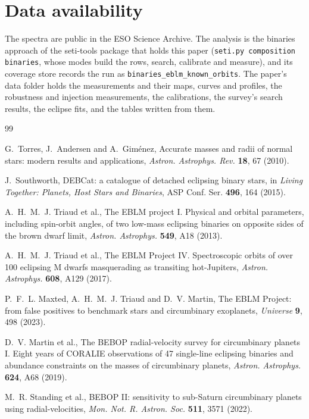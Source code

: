 \documentclass[3p,11pt]{elsarticle}
\begin{document}
\section*{Data availability}

The spectra are public in the ESO Science Archive. The analysis is the binaries approach of the
seti-tools package that holds this paper (\texttt{seti.py composition binaries}, whose modes build
the rows, search, calibrate and measure), and its coverage store records the run as
\texttt{binaries\_eblm\_known\_orbits}. The paper's data folder holds the measurements and their
maps, curves and profiles, the robustness and injection measurements, the calibrations, the
survey's search results, the eclipse fits, and the tables written from them.

\begin{thebibliography}{99}\small\raggedright
\setlength{\itemsep}{1pt}

G.~Torres, J.~Andersen and A.~Gim\'enez, Accurate masses and radii of normal stars: modern
results and applications, \emph{Astron. Astrophys. Rev.} \textbf{18}, 67 (2010).

J.~Southworth, DEBCat: a catalogue of detached eclipsing binary stars, in \emph{Living Together:
Planets, Host Stars and Binaries}, ASP Conf. Ser. \textbf{496}, 164 (2015).

A.~H.~M.~J. Triaud et al., The EBLM project I. Physical and orbital parameters, including
spin-orbit angles, of two low-mass eclipsing binaries on opposite sides of the brown dwarf limit,
\emph{Astron. Astrophys.} \textbf{549}, A18 (2013).

A.~H.~M.~J. Triaud et al., The EBLM Project IV. Spectroscopic orbits of over 100 eclipsing M
dwarfs masquerading as transiting hot-Jupiters, \emph{Astron. Astrophys.} \textbf{608}, A129
(2017).

P.~F.~L. Maxted, A.~H.~M.~J. Triaud and D.~V. Martin, The EBLM Project: from false positives to
benchmark stars and circumbinary exoplanets, \emph{Universe} \textbf{9}, 498 (2023).

D.~V. Martin et al., The BEBOP radial-velocity survey for circumbinary planets I. Eight years of
CORALIE observations of 47 single-line eclipsing binaries and abundance constraints on the masses
of circumbinary planets, \emph{Astron. Astrophys.} \textbf{624}, A68 (2019).

M.~R. Standing et al., BEBOP II: sensitivity to sub-Saturn circumbinary planets using
radial-velocities, \emph{Mon. Not. R. Astron. Soc.} \textbf{511}, 3571 (2022).


\end{thebibliography}
\end{document}
